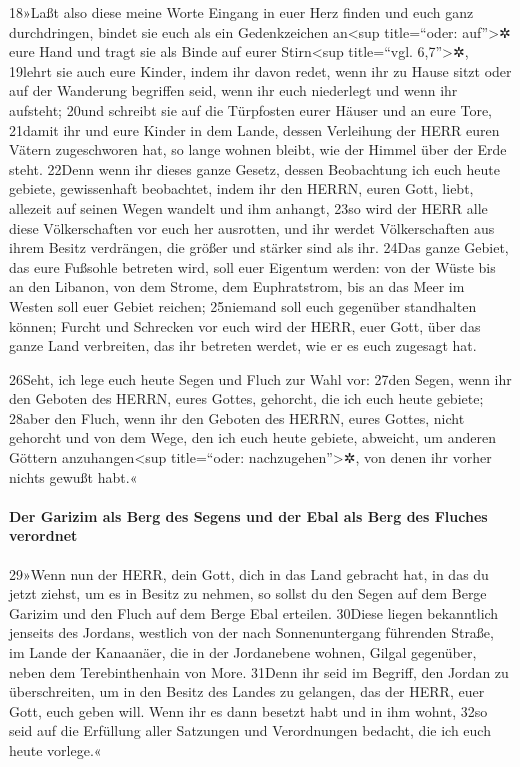 18»Laßt also diese meine Worte Eingang in euer Herz finden und euch ganz
durchdringen, bindet sie euch als ein Gedenkzeichen an\textless sup
title=``oder: auf''\textgreater✲ eure Hand und tragt sie als Binde auf
eurer Stirn\textless sup title=``vgl. 6,7''\textgreater✲, 19lehrt sie
auch eure Kinder, indem ihr davon redet, wenn ihr zu Hause sitzt oder
auf der Wanderung begriffen seid, wenn ihr euch niederlegt und wenn ihr
aufsteht; 20und schreibt sie auf die Türpfosten eurer Häuser und an eure
Tore, 21damit ihr und eure Kinder in dem Lande, dessen Verleihung der
HERR euren Vätern zugeschworen hat, so lange wohnen bleibt, wie der
Himmel über der Erde steht. 22Denn wenn ihr dieses ganze Gesetz, dessen
Beobachtung ich euch heute gebiete, gewissenhaft beobachtet, indem ihr
den HERRN, euren Gott, liebt, allezeit auf seinen Wegen wandelt und ihm
anhangt, 23so wird der HERR alle diese Völkerschaften vor euch her
ausrotten, und ihr werdet Völkerschaften aus ihrem Besitz verdrängen,
die größer und stärker sind als ihr. 24Das ganze Gebiet, das eure
Fußsohle betreten wird, soll euer Eigentum werden: von der Wüste bis an
den Libanon, von dem Strome, dem Euphratstrom, bis an das Meer im Westen
soll euer Gebiet reichen; 25niemand soll euch gegenüber standhalten
können; Furcht und Schrecken vor euch wird der HERR, euer Gott, über das
ganze Land verbreiten, das ihr betreten werdet, wie er es euch zugesagt
hat.

26Seht, ich lege euch heute Segen und Fluch zur Wahl vor: 27den Segen,
wenn ihr den Geboten des HERRN, eures Gottes, gehorcht, die ich euch
heute gebiete; 28aber den Fluch, wenn ihr den Geboten des HERRN, eures
Gottes, nicht gehorcht und von dem Wege, den ich euch heute gebiete,
abweicht, um anderen Göttern anzuhangen\textless sup title=``oder:
nachzugehen''\textgreater✲, von denen ihr vorher nichts gewußt habt.«

\hypertarget{der-garizim-als-berg-des-segens-und-der-ebal-als-berg-des-fluches-verordnet}{%
\paragraph{Der Garizim als Berg des Segens und der Ebal als Berg des
Fluches
verordnet}\label{der-garizim-als-berg-des-segens-und-der-ebal-als-berg-des-fluches-verordnet}}

29»Wenn nun der HERR, dein Gott, dich in das Land gebracht hat, in das
du jetzt ziehst, um es in Besitz zu nehmen, so sollst du den Segen auf
dem Berge Garizim und den Fluch auf dem Berge Ebal erteilen. 30Diese
liegen bekanntlich jenseits des Jordans, westlich von der nach
Sonnenuntergang führenden Straße, im Lande der Kanaanäer, die in der
Jordanebene wohnen, Gilgal gegenüber, neben dem Terebinthenhain von
More. 31Denn ihr seid im Begriff, den Jordan zu überschreiten, um in den
Besitz des Landes zu gelangen, das der HERR, euer Gott, euch geben will.
Wenn ihr es dann besetzt habt und in ihm wohnt, 32so seid auf die
Erfüllung aller Satzungen und Verordnungen bedacht, die ich euch heute
vorlege.«

